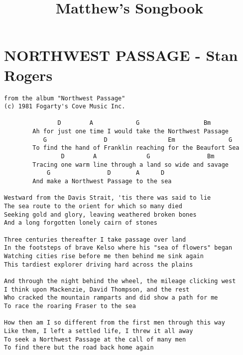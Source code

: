 \documentclass[leqno]{memoir}
\title{Matthew's Songbook}
\begin{document}
\pagestyle{headings}
\setcounter{page}{1}

\tableofcontents



\chapter{NORTHWEST PASSAGE - Stan Rogers}
\setcounter{page}{1}

\begin{verbatim}
from the album "Northwest Passage"
(c) 1981 Fogarty's Cove Music Inc.

               D        A            G                  Bm
        Ah for just one time I would take the Northwest Passage
           G                D                 Em               G
        To find the hand of Franklin reaching for the Beaufort Sea
                D        A              G                Bm
        Tracing one warm line through a land so wide and savage
            G                D       A      D
        And make a Northwest Passage to the sea

Westward from the Davis Strait, 'tis there was said to lie
The sea route to the orient for which so many died
Seeking gold and glory, leaving weathered broken bones
And a long forgotten lonely cairn of stones

Three centuries thereafter I take passage over land
In the footsteps of brave Kelso where his "sea of flowers" began
Watching cities rise before me then behind me sink again
This tardiest explorer driving hard across the plains

And through the night behind the wheel, the mileage clicking west
I think upon Mackenzie, David Thompson, and the rest
Who cracked the mountain ramparts and did show a path for me
To race the roaring Fraser to the sea

How then am I so different from the first men through this way
Like them, I left a settled life, I threw it all away
To seek a Northwest Passage at the call of many men
To find there but the road back home again
\end{verbatim}
\newpage
\end{document}
